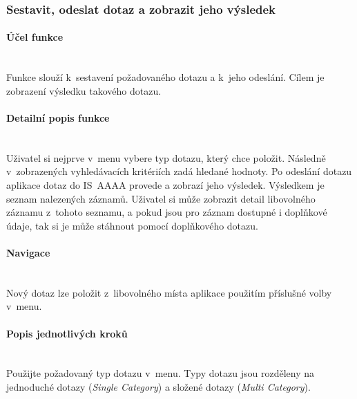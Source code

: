 \documentclass[thesis=M,czech]{FITthesis}[2019/12/23]
\newcommand{\lbparagraph}[1]{\paragraph{#1}\mbox{}\\} %
\begin{document}
\subsubsection{Sestavit, odeslat dotaz a zobrazit jeho výsledek}
\lbparagraph{Účel funkce}
Funkce slouží k~sestavení požadovaného dotazu a k~jeho odeslání. Cílem je zobrazení výsledku takového dotazu.

\lbparagraph{Detailní popis funkce}
Uživatel si nejprve v~menu vybere typ dotazu, který chce položit. Následně v~zobrazených vyhledávacích kritériích zadá hledané hodnoty. Po odeslání dotazu aplikace dotaz do IS~AAAA provede a zobrazí jeho výsledek. Výsledkem je seznam nalezených záznamů. Uživatel si může zobrazit detail libovolného záznamu z~tohoto seznamu, a pokud jsou pro záznam dostupné i doplňkové údaje, tak si je může stáhnout pomocí doplňkového dotazu.

\lbparagraph{Navigace}
Nový dotaz lze položit z~libovolného místa aplikace použitím příslušné volby v~menu.

\lbparagraph{Popis jednotlivých kroků}

Použijte požadovaný typ dotazu v~menu. Typy dotazu jsou rozděleny na jednoduché dotazy (\textit{Single Category}) a složené dotazy (\textit{Multi Category}).
\end{document}
